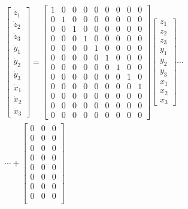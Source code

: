\documentclass[letterpaper, 12pt]{article}
\begin{document}
\begin{enumerate}
\begin{enumerate}
\begin{multline*}
\begin{bmatrix}
\dot{z}_1\\ 
\dot{z}_2\\ 
\dot{z}_3\\ 
\dot{y}_1\\ 
\dot{y}_2\\ 
\dot{y}_3\\ 
\dot{x}_1\\ 
\dot{x}_2\\ 
\dot{x}_3
\end{bmatrix}
=
\begin{bmatrix}
1 &0  &0  &0  &0  &0  &0  &0  &0 \\ 
0 &1  &0  &0  &0  &0  &0  &0  &0 \\ 
0 &0  &1  &0  &0  &0  &0  &0  &0 \\ 
0 &0  &0  &1  &0  &0  &0  &0  &0 \\ 
0 &0  &0  &0  &1  &0  &0  &0  &0 \\ 
0 &0  &0  &0  &0  &1  &0  &0  &0 \\ 
0 &0  &0  &0  &0  &0  &1  &0  &0 \\ 
0 &0  &0  &0  &0  &0  &0  &1  &0 \\ 
0 &0  &0  &0  &0  &0  &0  &0  &1 \\ 
0 &0  &0  &0  &0  &0  &0  &0  &0 \\ 
0 &0  &0  &0  &0  &0  &0  &0  &0 \\ 
0 &0  &0  &0  &0  &0  &0  &0  &0 
\end{bmatrix}
\begin{bmatrix}
z_1\\ 
z_2\\ 
z_3\\ 
y_1\\ 
y_2\\ 
y_3\\ 
x_1\\ 
x_2\\ 
x_3
\end{bmatrix}
\cdots \\
\cdots +
\begin{bmatrix}
0 &0  &0   \\ 
0 &0  &0   \\ 
0 &0  &0 \\
0  &0  &0 \\
0  &0  &0 \\
0  &0  &0 \\
0  &0  &0 \\
0  &0  &0 \\

\end{bmatrix}
\end{multline*}
\end{enumerate}
\end{enumerate}
\end{document}
